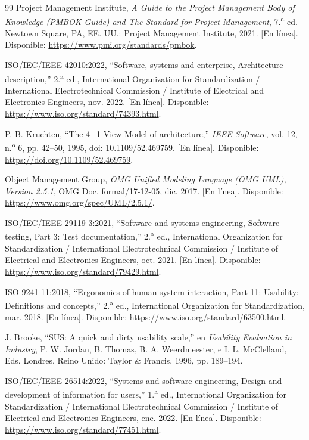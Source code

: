 \documentclass[12pt,letterpaper,oneside]{article}
\begin{document}
\begin{thebibliography}{99}
 Project Management Institute, \textit{A Guide to the Project Management Body of Knowledge (PMBOK Guide) and The Standard for Project Management}, 7.\textsuperscript{a} ed. Newtown Square, PA, EE. UU.: Project Management Institute, 2021. [En línea]. Disponible: \url{https://www.pmi.org/standards/pmbok}.

 ISO/IEC/IEEE 42010:2022, ``Software, systems and enterprise, Architecture description,'' 2.\textsuperscript{a} ed., International Organization for Standardization / International Electrotechnical Commission / Institute of Electrical and Electronics Engineers, nov. 2022. [En línea]. Disponible: \url{https://www.iso.org/standard/74393.html}.

 P. B. Kruchten, ``The 4+1 View Model of architecture,'' \textit{IEEE Software}, vol. 12, n.\textsuperscript{o} 6, pp. 42--50, 1995, doi: 10.1109/52.469759. [En línea]. Disponible: \url{https://doi.org/10.1109/52.469759}.

 Object Management Group, \textit{OMG Unified Modeling Language (OMG UML), Version 2.5.1}, OMG Doc. formal/17-12-05, dic. 2017. [En línea]. Disponible: \url{https://www.omg.org/spec/UML/2.5.1/}.

 ISO/IEC/IEEE 29119-3:2021, ``Software and systems engineering, Software testing, Part 3: Test documentation,'' 2.\textsuperscript{a} ed., International Organization for Standardization / International Electrotechnical Commission / Institute of Electrical and Electronics Engineers, oct. 2021. [En línea]. Disponible: \url{https://www.iso.org/standard/79429.html}.

 ISO 9241-11:2018, ``Ergonomics of human-system interaction, Part 11: Usability: Definitions and concepts,'' 2.\textsuperscript{a} ed., International Organization for Standardization, mar. 2018. [En línea]. Disponible: \url{https://www.iso.org/standard/63500.html}.

 J. Brooke, ``SUS: A quick and dirty usability scale,'' en \textit{Usability Evaluation in Industry}, P. W. Jordan, B. Thomas, B. A. Weerdmeester, e I. L. McClelland, Eds. Londres, Reino Unido: Taylor \& Francis, 1996, pp. 189--194.

 ISO/IEC/IEEE 26514:2022, ``Systems and software engineering, Design and development of information for users,'' 1.\textsuperscript{a} ed., International Organization for Standardization / International Electrotechnical Commission / Institute of Electrical and Electronics Engineers, ene. 2022. [En línea]. Disponible: \url{https://www.iso.org/standard/77451.html}.


\end{thebibliography}
\end{document}
